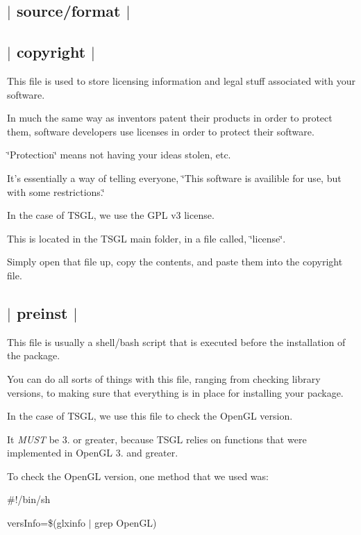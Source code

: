  \subsection*{$\vert$ source/format $\vert$ }



 \subsection*{$\vert$ copyright $\vert$ }

This file is used to store licensing information and legal stuff associated with your software.

In much the same way as inventors patent their products in order to protect them, software developers use licenses in order to protect their software.

\char`\"{}\-Protection\char`\"{} means not having your ideas stolen, etc.

It's essentially a way of telling everyone, \char`\"{}\-This software is availible for use, but with some restrictions.\char`\"{}

In the case of T\-S\-G\-L, we use the G\-P\-L v3 license.

This is located in the T\-S\-G\-L main folder, in a file called, \char`\"{}license\char`\"{}.

Simply open that file up, copy the contents, and paste them into the copyright file. 

 \subsection*{$\vert$ preinst $\vert$ }

This file is usually a shell/bash script that is executed before the installation of the package.

You can do all sorts of things with this file, ranging from checking library versions, to making sure that everything is in place for installing your package.

In the case of T\-S\-G\-L, we use this file to check the Open\-G\-L version.

It {\itshape M\-U\-S\-T} be 3. or greater, because T\-S\-G\-L relies on functions that were implemented in Open\-G\-L 3. and greater.

To check the Open\-G\-L version, one method that we used was\-:

\#!/bin/sh

vers\-Info=\$(glxinfo $\vert$ grep Open\-G\-L)

